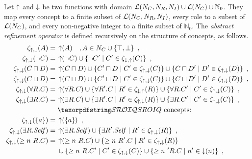 \begin{definition}
  Let $\operatorname{\uparrow}$ and $\operatorname{\downarrow}$ be two functions with domain $\mathcal{L}(N_C, N_R, N_I) \cup \mathcal{L}(N_C) \cup \mathbb{N}_0$. They map every concept to a finite subset of $\mathcal{L}(N_C, N_R, N_I)$, every role to a subset of $\mathcal{L}(N_C)$, and every non-negative integer to a finite subset of $\mathbb{N}_0$.
  The \emph{abstract refinement operator} is defined recursively on the structure of concepts, as follows.
  \begin{align*}
    \zeta_{\refine,\corefine}(A) ={} & \refine(A) \quad, A \in N_C \cup \{\top, \bot\} \enspace, \\
    \zeta_{\refine,\corefine}(\lnot C) ={} & \refine(\lnot C) \cup \{ \lnot C' \mid C' \in \zeta_{\corefine,\refine}(C) \} \enspace, \\
    \zeta_{\refine,\corefine}(C \sqcap D) ={} & \refine(C \sqcap D) \cup \{ C' \sqcap D \mid C' \in \zeta_{\refine,\corefine}(C) \}
    \cup \{ C \sqcap D' \mid D' \in \zeta_{\refine,\corefine}(D) \} \enspace, \\
    \zeta_{\refine,\corefine}(C \sqcup D) ={} & \refine(C \sqcup D) \cup \{ C' \sqcup D \mid C' \in \zeta_{\refine,\corefine}(C) \}
    \cup \{ C \sqcup D' \mid D' \in \zeta_{\refine,\corefine}(D) \} \enspace, \\
    \zeta_{\refine,\corefine}(\forall R.C) ={} & \refine(\forall R.C) \cup \{ \forall R'.C \mid R' \in \zeta_{\corefine,\refine}(R) \}
    \cup \{ \forall R.C' \mid C' \in \zeta_{\refine,\corefine}(C) \} \enspace, \\
    \zeta_{\refine,\corefine}(\exists R.C) ={} & \refine(\exists R.C) \cup \{ \exists R'.C \mid R' \in \zeta_{\refine,\corefine}(R) \}
    \cup \{ \exists R.C' \mid C' \in \zeta_{\refine,\corefine}(C) \} \enspace, \\
    & \text{\SROIQ concepts:} \\
    \zeta_{\refine,\corefine}(\nominal a) ={} & \refine(\nominal a) \enspace, \\
    \zeta_{\refine,\corefine}(\exists R.\self) ={} & \refine(\exists R.\self) \cup \{ \exists R'.\self \mid R' \in \zeta_{\refine,\corefine}(R) \} \enspace, \\
    \zeta_{\refine,\corefine}(\more n R.C) ={} & \refine(\more n R.C) \cup \{ \more n R'.C \mid R' \in \zeta_{\refine,\corefine}(R) \} \\
    & \cup \{ \more n R.C' \mid C' \in \zeta_{\refine,\corefine}(C) \}
    \cup \{ \more n' R.C \mid n' \in \corefine(n) \} \enspace, \\

\end{align*}
\end{definition}
